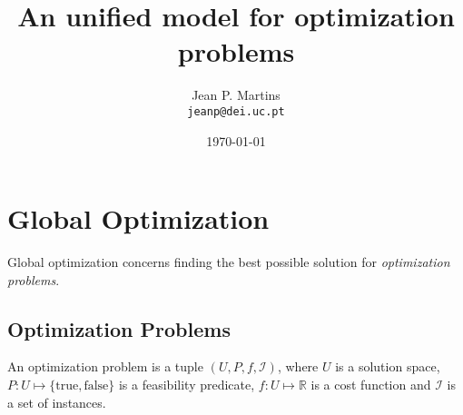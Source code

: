 \documentclass[12pt]{llncs}
\author{Jean P. Martins\\ \texttt{\lowercase{jeanp@dei.uc.pt}}}
\institute{University of Coimbra, Portugal}
\title{An unified model for optimization problems}
\date{\today}
\begin{document}
\maketitle


%
%

\section{Global Optimization}
Global optimization concerns finding the best possible solution for \textit{optimization problems}. 

\subsection{Optimization Problems}

\begin{definition} An optimization problem is a tuple $(U, P, f, \mathcal{I})$, where $U$ is a solution space, $P: U \mapsto \{\mbox{true}, \mbox{false}\}$ is a feasibility predicate, $f: U \mapsto \mathbb{R}$ is a cost function and $\mathcal{I}$ is a set of instances. 
\end{definition}
\end{document}

